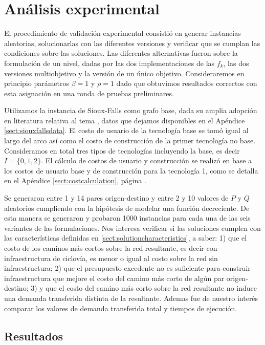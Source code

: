 \FloatBarrier
\section{Análisis experimental}

El procedimiento de validación experimental consistió en generar instancias aleatorias, solucionarlas con las diferentes versiones y verificar que se cumplan las condiciones sobre las soluciones. Las diferentes alternativas fueron sobre la formulación de un nivel, dadas por las dos implementaciones de las $f_k$, las dos versiones multiobjetivo y la versión de un único objetivo. Consideraremos en principio parámetros $\beta = 1$ y $\rho = 1$ dado que obtuvimos resultados correctos con esta asignación en una ronda de pruebas preliminares.

Utilizamos la instancia de Sioux-Falls como grafo base, dada su amplia adopción en literatura relativa al tema \parencite{Liu2019}, datos que dejamos disponibles en el Apéndice \ref{sect:siouxfallsdata}. El costo de usuario de la tecnología base se tomó igual al largo del arco así como el costo de construcción de la primer tecnología no base. Consideramos en total tres tipos de tecnologías incluyendo la base, es decir $I = \{0, 1, 2\}$. El cálculo de costos de usuario y construcción se realizó en base a los costos de usuario base y de construcción para la tecnología 1, como se detalla en el Apéndice \ref{sect:costcalculation}, página \pageref{sect:costcalculation}.

Se generaron entre 1 y 14 pares origen-destino y entre 2 y 10 valores de $P$ y $Q$ aleatorios cumpliendo con la hipótesis de modelar una función decreciente.
De esta manera se generaron y probaron 1000 instancias para cada una de las seis variantes de las formulaciones. Nos interesa verificar si las soluciones cumplen con las características definidas en \ref{sect:solutioncharacteristics}, a saber: 1) que el costo de los caminos más cortos sobre la red resultante, es decir con infraestructura de ciclovía, es menor o igual al costo sobre la red sin infraestructura; 2) que el presupuesto excedente no es suficiente para construir infraestructura que mejore el costo del camino más corto de algún par origen-destino; 3) y que el costo del camino más corto sobre la red resultante no induce una demanda transferida distinta de la resultante. Ademas fue de nuestro interés comparar los valores de demanda transferida total y tiempos de ejecución.

\FloatBarrier
\subsection{Resultados}

